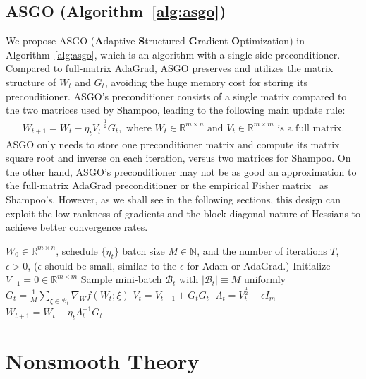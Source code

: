 \documentclass{article}
\theoremstyle{remark}
\newcommand{\Abs}[1]{\left\vert #1 \right\vert}
\newcommand{\cB}{\mathcal{B}}
\newcommand{\RR}{\mathbb{R}}
\begin{document}
\subsection{ASGO (Algorithm~\ref{alg:asgo})}
We propose ASGO (\textbf{A}daptive \textbf{S}tructured \textbf{G}radient \textbf{O}ptimization) in Algorithm~\ref{alg:asgo}, which is an algorithm with a single-side preconditioner. Compared to full-matrix AdaGrad, ASGO preserves and utilizes the matrix structure of $W_t$ and $G_t$, avoiding the huge memory cost for storing its preconditioner. ASGO's preconditioner consists of a single matrix compared to the two matrices used by Shampoo, leading to the following main update rule:
\begin{align*}
    W_{t+1} = W_t - \eta_t V_t^{-\frac{1}{2}} G_t, \text{ where $W_t \in \RR^{m\times n}$ and $V_t \in \RR^{m\times m}$ is a full matrix.}
\end{align*}
ASGO only needs to store one preconditioner matrix and compute its matrix square root and inverse on each iteration, versus two matrices for Shampoo. On the other hand, ASGO's preconditioner may not be as good an approximation to the full-matrix AdaGrad preconditioner or the empirical Fisher matrix~\citep{gupta2018shampoo,morwani2024new} as Shampoo's. However, as we shall see in the following sections, this design can %
exploit the low-rankness of gradients and the block diagonal nature of Hessians
to achieve
better convergence rates.

\begin{algorithm}[tb]
   \caption{ASGO (\textbf{A}daptive \textbf{S}tructured \textbf{G}radient \textbf{O}ptimization)}
   \label{alg:asgo}
\begin{algorithmic}[1]
    $W_0\in \RR^{m\times n}$, schedule $\{\eta_t\}$ batch size $M\in \mathbb{N}$, and the number of iterations $T$, \\ $\epsilon >0$, ($\epsilon$ should be small, similar to the $\epsilon$ for Adam or AdaGrad.)
   \STATE Initialize $V_{-1}=0 \in \RR^{m\times m}$
   \STATE Sample mini-batch $\cB_t$ with $\Abs{\cB_t} \equiv M$ uniformly
   \STATE $G_t = \frac{1}{M} \sum_{\xi\in\cB_t} \nabla_W f(W_t;\xi)$
   \STATE $V_t = V_{t-1} + G_t G_t^\top$
   \STATE $\Lambda_t = V_t^{\frac{1}{2}} + \epsilon I_m$
   \STATE
   $W_{t+1} = W_t - \eta_t \Lambda_t^{-1}G_t$
   \ENDFOR
\end{algorithmic}
\end{algorithm}

\section{Nonsmooth Theory}\label{sec:nonsmooth}
\end{document}
